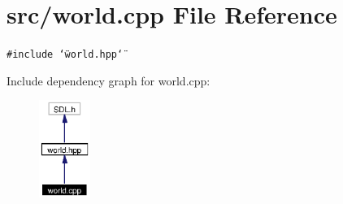 \section{src/world.cpp File Reference}
\label{world_8cpp}
{\tt \#include \char`\"{}world.hpp\char`\"{}}\par


Include dependency graph for world.cpp:\begin{figure}[H]
\begin{center}
\leavevmode
\includegraphics[width=47pt]{world_8cpp__incl}
\end{center}
\end{figure}
